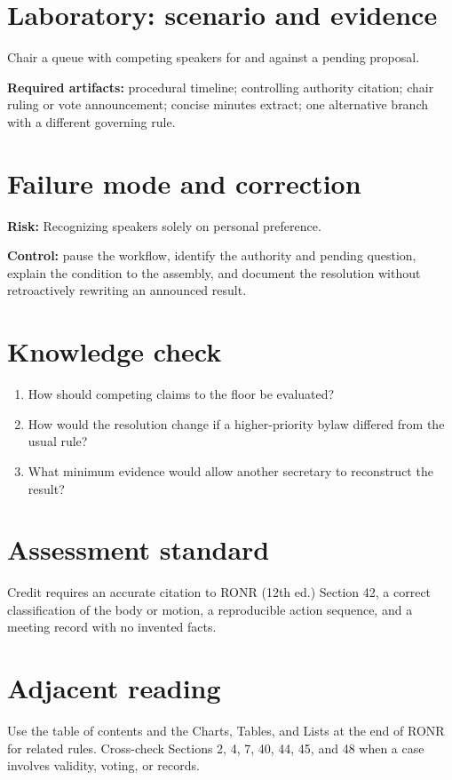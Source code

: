 \documentclass[11pt]{article}
\begin{document}
\section{Laboratory: scenario and evidence}
Chair a queue with competing speakers for and against a pending proposal.

\textbf{Required artifacts:} procedural timeline; controlling authority citation; chair ruling or vote announcement; concise minutes extract; one alternative branch with a different governing rule.

\section{Failure mode and correction}
\textbf{Risk:} Recognizing speakers solely on personal preference.

\textbf{Control:} pause the workflow, identify the authority and pending question, explain the condition to the assembly, and document the resolution without retroactively rewriting an announced result.

\section{Knowledge check}
\begin{enumerate}[leftmargin=*,itemsep=4pt]
\item How should competing claims to the floor be evaluated?
\item How would the resolution change if a higher-priority bylaw differed from the usual rule?
\item What minimum evidence would allow another secretary to reconstruct the result?
\end{enumerate}

\section{Assessment standard}
Credit requires an accurate citation to RONR (12th ed.) Section 42, a correct classification of the body or motion, a reproducible action sequence, and a meeting record with no invented facts.

\section{Adjacent reading}
Use the table of contents and the Charts, Tables, and Lists at the end of RONR for related rules. Cross-check Sections 2, 4, 7, 40, 44, 45, and 48 when a case involves validity, voting, or records.
\end{document}
